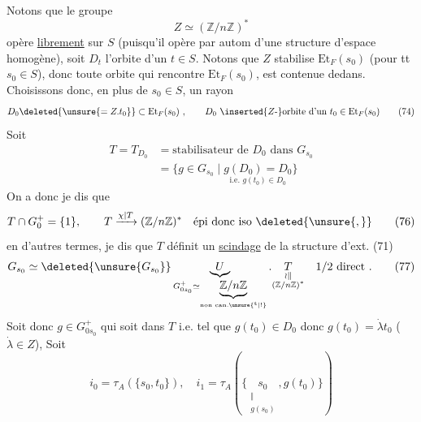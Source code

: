 Notons que le groupe
\[
Z\simeq(\mathbb Z/n\mathbb Z)^*
\]
opère \uline{librement} sur $S$ (puisqu'il opère par autom d'une structure d'espace homogène), soit $D_t$  l'orbite  d'un $t\in S$. Notons que $Z$ stabilise $\mathrm{Et}_F(s_0)$ (pour tt $s_0\in S$), donc toute orbite  qui rencontre $\mathrm{Et}_F(s_0)$, est contenue dedans. Choisissons donc, en plus de $s_0\in S$, un rayon 
\[
D_0\deleted{\unsure{=Z.t_0}}\subset\mathrm{Et}_F(s_0)\ ,\qquad D_0\ \inserted{Z\text{-}}\text{orbite d'un }
t_0\in\mathrm{Et}_F(s_0)
\tag*{(74)}
\]
Soit
\[
\begin{aligned}
 T=T_{D_0}&=\text{stabilisateur de }D_0\text{ dans }G_{s_0}\\
 &=\{g\in G_{s_0}\mid\underset{\text{i.e. }g(t_0)\in D_0}{g(D_0)=D_0}\}
\end{aligned}\tag*{(75)}
\]
 On a donc
\diagram{\[
\begin{tikzcd}[ampersand replacement=\&,row sep=0.5em,column sep=0.4em]
G^+_{0s_0}=\deleted{\unsure{T|\mathcal U}}U_{\deleted{\unsure{s_0}}}\subset \& G_{s_0} \& =\overset{\deleted{\unsure{B}}}{B'}\\
\& T_{\deleted{\unsure{0}}}\arrow[u,phantom,"\rotatebox{90}{$\subset$}" description] \& ,
\end{tikzcd}
\]}
 je dis que
\[
T\cap G_0^+=\{1\},\qquad T\xrightarrow{\chi\mid T}(\mathbb Z/n\mathbb Z)^*
\quad\text{épi donc iso}\ \deleted{\unsure{,}}
\tag*{(76)}
\]
en d'autres termes, je dis que $T$ définit un \uline{scindage} de la structure d'ext. (71)
\[
G_{s_0}\simeq\deleted{\unsure{G_{s_0}}}
\underbrace{U}_{G^+_{0s_0}\simeq\underbrace{\mathbb Z/n\mathbb Z}_{\text{non can.}\unsure{^{\mathrm t}|!}}}.
\underset{\substack{\wr\Vert\\(\mathbb Z/n\mathbb Z)^*}}{T}\quad 1/2\ \text{direct}\ .
\tag*{(77)}
\]
Soit donc $g\in G^+_{0s_0}$ qui soit dans $T$ i.e. tel que $g(t_0)\in D_0$ donc $g(t_0)=\dot\lambda t_0$ ($\dot\lambda\in Z$),  Soit
\[
i_0=\tau_A(\{s_0,t_0\}),\quad i_1=\tau_A(\{\underset{\substack{\Vert\\g(s_0)}}{s_0},g(t_0)\})
\]
